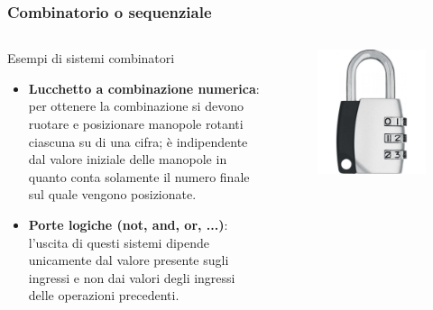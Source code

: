 \begin{frame}
	\frametitle{Combinatorio o sequenziale}
	

	\begin{columns}			
		
		\begin{block}{Esempi di sistemi combinatori}
			\begin{itemize}
				\item \textbf{Lucchetto a combinazione numerica}:\\per ottenere la combinazione si devono ruotare e posizionare manopole rotanti ciascuna su di una cifra; è indipendente dal valore iniziale delle manopole in quanto conta solamente il numero finale sul quale vengono posizionate.
				\item \textbf{Porte logiche (not,  and, or, ...)}:\\l'uscita di questi sistemi dipende unicamente dal valore presente sugli ingressi e non dai valori degli ingressi delle operazioni precedenti.
			\end{itemize}
		\end{block}
					
		\begin{figure}[!htbp] 
			\centering
			\includegraphics[width=0.7\linewidth]{images/1_i_sistemi/lock.png}
		\end{figure}
		

\end{columns}
\end{frame}
